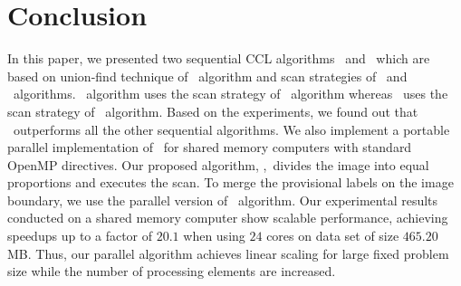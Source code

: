 \vspace{\sectionSpace}
\section{Conclusion}
\label{conclusion}
In this paper, we presented two sequential CCL algorithms \nremsp\ and \aremsp\
which are based on union-find technique of \rems\ algorithm and scan strategies 
of \arun\ and \lrpc\ algorithms. \nremsp\ algorithm uses the scan strategy of
\lrpc\ algorithm whereas \aremsp\ uses the scan strategy of \arun\ algorithm.
Based on the experiments, we found out that \aremsp\ outperforms all the
other sequential algorithms. We also implement a portable parallel
implementation of \aremsp\ for shared memory computers with standard OpenMP
directives.
Our proposed algorithm, \paremsp,\ divides the image into equal proportions and
executes the scan. 
To merge the provisional labels on the image boundary, we use the parallel version of \rems\ algorithm. 
Our experimental results conducted on a shared memory computer show scalable performance, achieving speedups up
to a factor of $20.1$ when using $24$ cores on data set of size $465.20$ MB. Thus, our parallel algorithm achieves linear scaling for large
fixed problem size while the number of processing elements are increased. 

